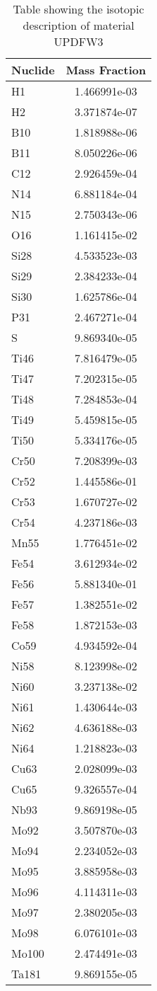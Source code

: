\begin{centering}
\begin{table}[ht!]
\begin{tabular}{l | c}
\hline
Nuclide & Mass Fraction\\
\hline
H1 & 1.466991e-03\\
H2 & 3.371874e-07\\
B10 & 1.818988e-06\\
B11 & 8.050226e-06\\
C12 & 2.926459e-04\\
N14 & 6.881184e-04\\
N15 & 2.750343e-06\\
O16 & 1.161415e-02\\
Si28 & 4.533523e-03\\
Si29 & 2.384233e-04\\
Si30 & 1.625786e-04\\
P31 & 2.467271e-04\\
S & 9.869340e-05\\
Ti46 & 7.816479e-05\\
Ti47 & 7.202315e-05\\
Ti48 & 7.284853e-04\\
Ti49 & 5.459815e-05\\
Ti50 & 5.334176e-05\\
Cr50 & 7.208399e-03\\
Cr52 & 1.445586e-01\\
Cr53 & 1.670727e-02\\
Cr54 & 4.237186e-03\\
Mn55 & 1.776451e-02\\
Fe54 & 3.612934e-02\\
Fe56 & 5.881340e-01\\
Fe57 & 1.382551e-02\\
Fe58 & 1.872153e-03\\
Co59 & 4.934592e-04\\
Ni58 & 8.123998e-02\\
Ni60 & 3.237138e-02\\
Ni61 & 1.430644e-03\\
Ni62 & 4.636188e-03\\
Ni64 & 1.218823e-03\\
Cu63 & 2.028099e-03\\
Cu65 & 9.326557e-04\\
Nb93 & 9.869198e-05\\
Mo92 & 3.507870e-03\\
Mo94 & 2.234052e-03\\
Mo95 & 3.885958e-03\\
Mo96 & 4.114311e-03\\
Mo97 & 2.380205e-03\\
Mo98 & 6.076101e-03\\
Mo100 & 2.474491e-03\\
Ta181 & 9.869155e-05
\end{tabular}
\caption{Table showing the isotopic description of material UPDFW3}
\label{table:material_UPDFW3}
\end{table}\clearpage


\end{centering}
